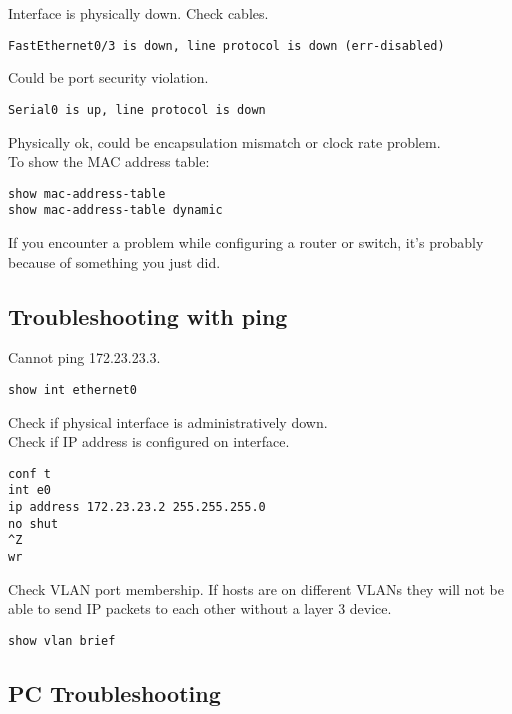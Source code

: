 Interface is physically down. Check cables.

\begin{verbatim}
FastEthernet0/3 is down, line protocol is down (err-disabled)
\end{verbatim}

Could be port security violation.

\begin{verbatim}
Serial0 is up, line protocol is down
\end{verbatim}

Physically ok, could be encapsulation mismatch or clock rate problem.\\

To show the MAC address table:

\begin{verbatim}
show mac-address-table
show mac-address-table dynamic
\end{verbatim}

If you encounter a problem while configuring a router or switch, it's probably
because of something you just did.

\subsection{Troubleshooting with ping}

Cannot ping 172.23.23.3.

\begin{verbatim}
show int ethernet0  
\end{verbatim}

Check if physical interface is administratively down.\\

Check if IP address is configured on interface.

\begin{verbatim}
conf t
int e0
ip address 172.23.23.2 255.255.255.0
no shut
^Z
wr
\end{verbatim}

Check VLAN port membership. If hosts are on different VLANs they will not be
able to send IP packets to each other without a layer 3 device.

\begin{verbatim}
show vlan brief
\end{verbatim}

\subsection{PC Troubleshooting}

